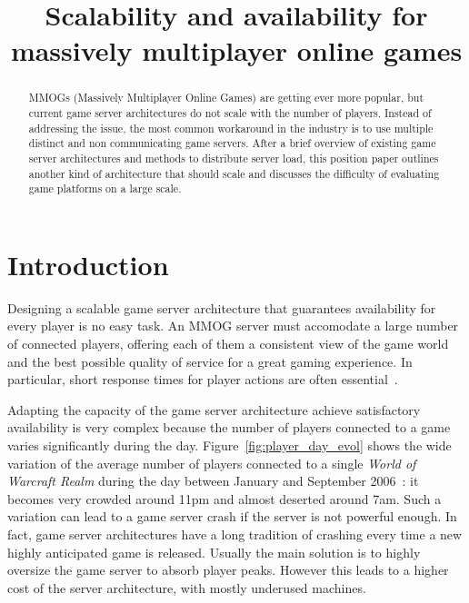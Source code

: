 \documentclass[conference]{IEEEtran}
\begin{document}
\title{Scalability and availability for massively multiplayer online games}


\author{
\and
{}
\and
{}
}

\maketitle


\begin{abstract}
MMOGs (Massively Multiplayer Online Games) are getting ever more popular, but current game server architectures do not scale with the number of players. Instead of addressing the issue, the most common workaround in the industry is to use multiple distinct and non communicating game servers.
After a brief overview of existing game server architectures and methods to distribute server load, this position paper outlines another kind of architecture that should scale and discusses the difficulty of evaluating game platforms on a large scale.
\end{abstract}

\section{Introduction}
Designing a scalable game server architecture that guarantees availability for every player is no easy task.
An MMOG server must accomodate a large number of connected players,
offering each of them a consistent view of the game world and the best possible quality of service for a great gaming experience. In particular, short response times for player actions are often essential~\cite{latency_can_kill}. 

Adapting the capacity of the game server architecture achieve satisfactory availability is very complex because the number of players connected to a game varies significantly during the day. Figure~\ref{fig:player_day_evol} shows the wide variation of the average number of players connected to a single \textit{World of Warcraft Realm} during the day between January and September 2006~\cite{is_server_consolidation_benefical}: it becomes very crowded around 11pm and almost deserted around 7am. Such a variation can lead to a game server crash if the server is not powerful enough. In fact, game server architectures have a long tradition of crashing every time a new highly anticipated game is released. Usually the main solution is to highly oversize the game server to absorb player peaks. However this leads to a higher cost of the server architecture, with mostly underused machines.
\end{document}
